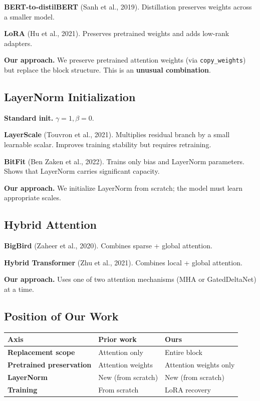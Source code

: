 \textbf{BERT-to-distilBERT} (Sanh et al., 2019). Distillation preserves weights 
across a smaller model.

\textbf{LoRA} (Hu et al., 2021). Preserves pretrained weights and adds low-rank 
adapters.

\textbf{Our approach.} We preserve pretrained attention weights (via \texttt{copy\_weights}) 
but replace the block structure. This is an \textbf{unusual combination}.

\subsection{LayerNorm Initialization}

\textbf{Standard init.} $\gamma = 1, \beta = 0$.

\textbf{LayerScale} (Touvron et al., 2021). Multiplies residual branch by a small 
learnable scalar. Improves training stability but requires retraining.

\textbf{BitFit} (Ben Zaken et al., 2022). Trains only bias and LayerNorm 
parameters. Shows that LayerNorm carries significant capacity.

\textbf{Our approach.} We initialize LayerNorm from scratch; the model must learn 
appropriate scales.

\subsection{Hybrid Attention}

\textbf{BigBird} (Zaheer et al., 2020). Combines sparse + global attention.

\textbf{Hybrid Transformer} (Zhu et al., 2021). Combines local + global attention.

\textbf{Our approach.} Uses one of two attention mechanisms (MHA or GatedDeltaNet) 
at a time.

\subsection{Position of Our Work}

\begin{table}[H]
\centering
\small
\begin{tabular}{lll}
\toprule
\textbf{Axis} & \textbf{Prior work} & \textbf{Ours} \\
\midrule
\textbf{Replacement scope} & Attention only & Entire block \\
\textbf{Pretrained preservation} & Attention weights & Attention weights only \\
\textbf{LayerNorm} & New (from scratch) & New (from scratch) \\
\textbf{Training} & From scratch & LoRA recovery \\
\bottomrule
\end{tabular}
\end{table}

